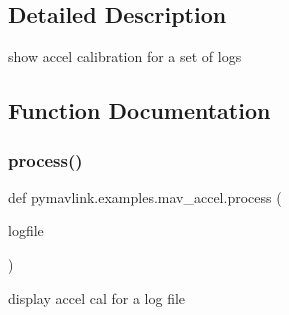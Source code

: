 \subsection{Detailed Description}
\begin{DoxyVerb}show accel calibration for a set of logs
\end{DoxyVerb}
 

\subsection{Function Documentation}
\mbox{\label{namespacepymavlink_1_1examples_1_1mav__accel_a07d793cb12eb94760b538aa704c189cb}} 
\subsubsection{\texorpdfstring{process()}{process()}}
{\footnotesize\ttfamily def pymavlink.\+examples.\+mav\+\_\+accel.\+process (\begin{DoxyParamCaption}\item[{}]{logfile }\end{DoxyParamCaption})}

\begin{DoxyVerb}display accel cal for a log file\end{DoxyVerb}
 